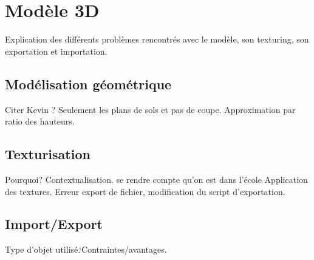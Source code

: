 \section{Modèle 3D}
Explication des différents problèmes rencontrés avec le modèle, son texturing, son exportation et importation.

\subsection{Modélisation géométrique}
Citer Kevin ?
Seulement les plans de sols et pas de coupe. Approximation par ratio des hauteurs.

\subsection{Texturisation}
Pourquoi? Contextualisation. se rendre compte qu'on est dans l'école
Application des textures.
Erreur export de fichier, modification du script d'exportation.

\subsection{Import/Export}
Type d'objet utilisé.`Contraintes/avantages.